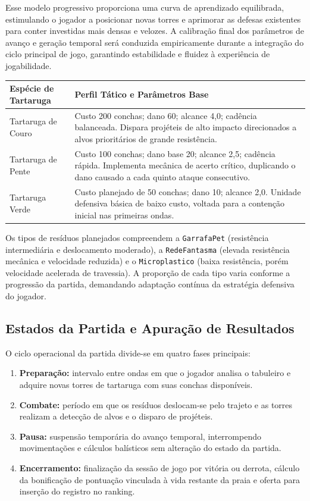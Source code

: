 \documentclass[11pt,a4paper]{article}
\begin{document}
Esse modelo progressivo proporciona uma curva de aprendizado equilibrada, estimulando o jogador a posicionar novas torres e aprimorar as defesas existentes para conter investidas mais densas e velozes. A calibração final dos parâmetros de avanço e geração temporal será conduzida empiricamente durante a integração do ciclo principal de jogo, garantindo estabilidade e fluidez à experiência de jogabilidade.

{\small
\begin{tabularx}{\textwidth}{|p{}|X|}
\hline
\textbf{Espécie de Tartaruga} & \textbf{Perfil Tático e Parâmetros Base} \\
\hline
Tartaruga de Couro & Custo 200 conchas; dano 60; alcance 4,0; cadência balanceada. Dispara projéteis de alto impacto direcionados a alvos prioritários de grande resistência. \\
\hline
Tartaruga de Pente & Custo 100 conchas; dano base 20; alcance 2,5; cadência rápida. Implementa mecânica de acerto crítico, duplicando o dano causado a cada quinto ataque consecutivo. \\
\hline
Tartaruga Verde & Custo planejado de 50 conchas; dano 10; alcance 2,0. Unidade defensiva básica de baixo custo, voltada para a contenção inicial nas primeiras ondas. \\
\hline
\end{tabularx}}

Os tipos de resíduos planejados compreendem a \texttt{GarrafaPet} (resistência intermediária e deslocamento moderado), a \texttt{RedeFantasma} (elevada resistência mecânica e velocidade reduzida) e o \texttt{Microplastico} (baixa resistência, porém velocidade acelerada de travessia). A proporção de cada tipo varia conforme a progressão da partida, demandando adaptação contínua da estratégia defensiva do jogador.

\subsection*{Estados da Partida e Apuração de Resultados}
O ciclo operacional da partida divide-se em quatro fases principais:
\begin{enumerate}
    \item \textbf{Preparação:} intervalo entre ondas em que o jogador analisa o tabuleiro e adquire novas torres de tartaruga com suas conchas disponíveis.
    \item \textbf{Combate:} período em que os resíduos deslocam-se pelo trajeto e as torres realizam a detecção de alvos e o disparo de projéteis.
    \item \textbf{Pausa:} suspensão temporária do avanço temporal, interrompendo movimentações e cálculos balísticos sem alteração do estado da partida.
    \item \textbf{Encerramento:} finalização da sessão de jogo por vitória ou derrota, cálculo da bonificação de pontuação vinculada à vida restante da praia e oferta para inserção do registro no ranking.
\end{enumerate}
\end{document}
